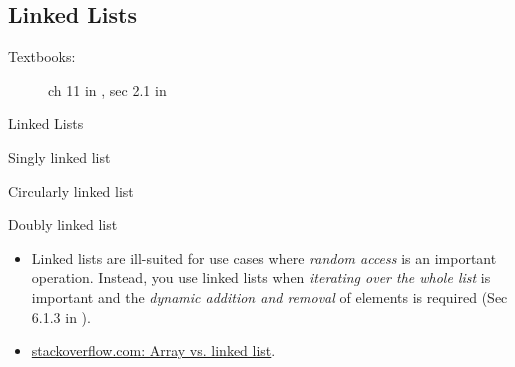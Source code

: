\subsection{Linked Lists}
\label{sec:linked-lists}

\begin{description}
\item[Textbooks:] ch 11 in \cite{corbet05ldd}, sec 2.1 in \cite{rodriguez2005linux}
\end{description}

\begin{frame}{Linked Lists}
  \begin{block}{Singly linked list}
    \begin{center}
    \end{center}
  \end{block}
  \begin{block}{Circularly linked list}
    \begin{center}
    \end{center}
  \end{block}
  \begin{block}{Doubly linked list}
    \begin{center}
    \end{center}
  \end{block}
\end{frame}

\begin{itemize}
\item Linked lists are ill-suited for use cases where \emph{random access} is an important
  operation. Instead, you use linked lists when \emph{iterating over the whole list} is
  important and the \emph{dynamic addition and removal} of elements is required (Sec 6.1.3
  in \cite{love2010linux}).
\item \href{http://stackoverflow.com/questions/166884/array-vs-linked-list}{stackoverflow.com:
    Array vs. linked list}.
\end{itemize}

